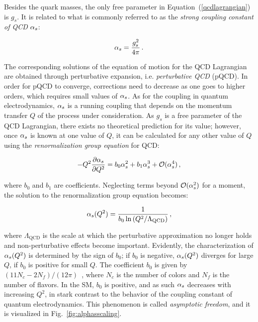 Besides the quark masses, the only free parameter in Equation~(\ref{qcdlagrangian}) is $g_s$.
% 
It is related to what is commonly referred to as the \textit{strong coupling constant of QCD} $\alpha_s$:
% 
\begin{linenomath*}
\begin{equation}
\alpha_s = \frac{g_s^2}{4\pi}
\,.
\end{equation}
\end{linenomath*}
% 
The corresponding solutions of the equation of motion for the QCD Lagrangian are obtained through perturbative expansion, i.e. \textit{perturbative QCD} (pQCD).
% 
In order for pQCD to converge, corrections need to decrease as one goes to higher orders, which requires small values of $\alpha_s$.
% 
As for the coupling in quantum electrodynamics, $\alpha_s$ is a running coupling that depends on the momentum transfer $Q$ of the process under consideration.
% 
As $g_s$ is a free parameter of the QCD Lagrangian, there exists no theoretical prediction for its value; however, once $\alpha_s$ is known at one value of $Q$, it can be calculated for any other value of $Q$ using the \textit{renormalization group equation} for QCD:
% 
\begin{linenomath*}
\begin{equation}
- Q^2 \frac{\partial\alpha_s}{\partial Q^2} = b_0 \alpha_s^2 + b_1 \alpha_s^3 + \mathcal{O}(\alpha_s^4)
\,,
\end{equation}
\end{linenomath*}
% 
where $b_0$ and $b_1$ are coefficients.
% 
Neglecting terms beyond $\mathcal{O}(\alpha_s^2)$ for a moment, the solution to the renormalization group equation becomes:
% 
\begin{linenomath*}
\begin{equation}
\alpha_s(Q^2) = \frac{1}{b_0 \ln \left( Q^2 / \Lambda_\text{QCD} \right)}
\,,
\end{equation}
\end{linenomath*}
% 
where $\Lambda_\text{QCD}$ is the scale at which the perturbative approximation no longer holds and non-perturbative effects become important.
% 
Evidently, the characterization of $\alpha_s(Q^2)$ is determined by the sign of $b_0$; if $b_0$ is negative, $\alpha_s(Q^2)$ diverges for large $Q$, if $b_0$ is positive for small $Q$.
% 
The coefficient $b_0$ is given by $(11 N_c - 2 N_f) / (12\pi)$~\cite{Dissertori:2015tfa}, where $N_c$ is the number of colors and $N_f$ is the number of flavors.
% 
In the SM, $b_0$ is positive, and as such $\alpha_s$ decreases with increasing $Q^2$, in stark contrast to the behavior of the coupling constant of quantum electrodynamics.
% 
This phenomenon is called \textit{asymptotic freedom}, and it is visualized in Fig.~\ref{fig:alphasscaling}.

